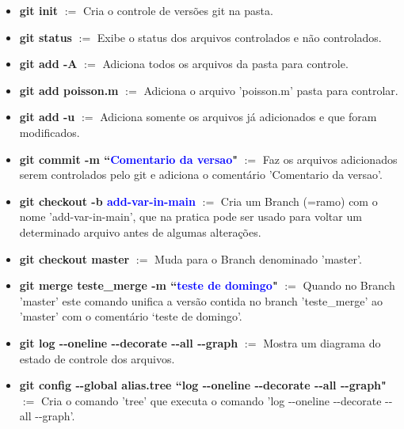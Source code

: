 \documentclass[12pt]{article}
\begin{document}
\begin{itemize}
	\item \textbf{git init} $:=$ Cria o controle de versões git na pasta.
	
	\item \textbf{git status} $:=$ Exibe o status dos arquivos controlados e não controlados.
	
	\item \textbf{git add -A} $:=$ Adiciona todos os arquivos da pasta para controle.
	
	\item \textbf{git add poisson.m} $:=$ Adiciona o arquivo 'poisson.m' pasta para controlar.
	
	\item \textbf{git add -u} $:=$ Adiciona somente os arquivos já adicionados e que foram modificados.
	
	\item \textbf{git commit -m ``\textcolor{blue}{Comentario da versao}"} $:=$ Faz os arquivos adicionados serem controlados pelo git e adiciona o comentário 'Comentario da versao'.
	
	\item \textbf{git checkout -b \textcolor{blue}{add-var-in-main}} $:=$ Cria um Branch (=ramo) com o nome 'add-var-in-main', que na pratica pode ser usado para voltar um determinado arquivo antes de algumas alterações. 
	
	\item \textbf{git checkout master} $:=$ Muda para o Branch denominado 'master'.
	
	\item \textbf{git merge teste\_merge -m ``\textcolor{blue}{teste de domingo}"} $:=$ Quando no Branch 'master' este comando unifica a versão contida no branch 'teste\_merge' ao 'master' com o comentário `teste de domingo'.
	
	\item \textbf{git log -\hspace{0.5mm}-oneline -\hspace{0.5mm}-decorate -\hspace{0.5mm}-all -\hspace{0.5mm}-graph} $:=$ Mostra um diagrama do estado de controle dos arquivos.
	
	\item \textbf{git config -\hspace{0.5mm}-global alias.tree ``log -\hspace{0.5mm}-oneline -\hspace{0.5mm}-decorate -\hspace{0.5mm}-all -\hspace{0.5mm}-graph"} $:=$ Cria o comando 'tree' que executa o comando 'log -\hspace{0.5mm}-oneline -\hspace{0.5mm}-decorate -\hspace{0.5mm}-all -\hspace{0.5mm}-graph'.
	

\end{itemize}
\end{document}
